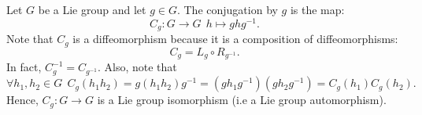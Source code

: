 \begin{eg}[Conjugation by \( g \in G  \)]
   Let \( G  \) be a Lie group and let \( g \in G  \). The conjugation by \( g  \) is the map: 
   \[  {C}_{g} : G \to G \ \ h \mapsto g h g^{-1}. \]
   Note that \( {C}_{g} \) is a diffeomorphism because it is a composition of diffeomorphisms:
   \[  {C}_{g} = {L}_{g} \circ {R}_{g^{-1}}.  \]
   In fact, \( {C}_{g}^{-1} = {C}_{g^{-1}} \). Also, note that 
   \[  \forall {h}_{1}, {h}_{2} \in G \ \ {C}_{g}({h}_{1}{h}_{2}) = g ({h}_{1}{h}_{2})g^{-1} = (g {h}_{1} g^{-1})(g {h}_{2} g^{-1}) = {C}_{g}({h}_{1}) {C}_{g}({h}_{2}). \]
   Hence, \( {C}_{g} : G \to G  \) is a Lie group isomorphism (i.e a Lie group automorphism).
\end{eg}


